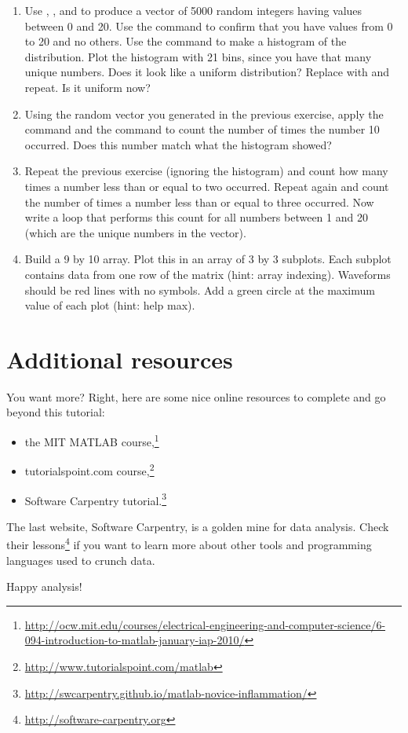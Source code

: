 \documentclass{article}
\begin{document}
\begin{enumerate}

\item Use , , and \mcode{*} to produce a vector of 5000 random integers having values between 0 and 20.
Use the  command to confirm that you have values from 0 to 20 and no others.
Use the  command to make a histogram of the distribution.
Plot the histogram with 21 bins, since you have that many unique numbers.
Does it look like a uniform distribution? Replace  with  and repeat.
Is it uniform now?

\item Using the random vector you generated in the previous exercise, apply the  command and the  command to count the number of times the number 10 occurred.
  Does this number match what the histogram showed?

\item Repeat the previous exercise (ignoring the histogram) and count how many times a number less than or equal to two occurred.
  Repeat again and count the number of times a number less than or equal to three occurred.
  Now write a  loop that performs this count for all numbers between 1 and 20 (which are the unique numbers in the vector).

\item Build a 9 by 10 array. Plot this in an array of 3 by 3 subplots.
  Each subplot contains data from one row of the matrix (hint: array indexing).
  Waveforms should be red lines with no symbols.
  Add a green circle at the maximum value of each plot (hint: help max).

\end{enumerate}

\section{Additional resources}

You want more?
Right, here are some nice online resources to complete and go beyond this tutorial:
\begin{itemize}
  \item the MIT MATLAB course,\footnote{%
    \url{http://ocw.mit.edu/courses/electrical-engineering-and-computer-science/6-094-introduction-to-matlab-january-iap-2010/}
  }
  \item tutorialspoint.com course,\footnote{%
    \url{http://www.tutorialspoint.com/matlab}
  }
  \item Software Carpentry tutorial.\footnote{%
    \url{http://swcarpentry.github.io/matlab-novice-inflammation/}
  }
\end{itemize}

The last website, Software Carpentry, is a golden mine for data analysis.
Check their lessons\footnote{\url{http://software-carpentry.org}} if you want to learn more about other tools and programming languages used to crunch data.

Happy analysis!
\end{document}
